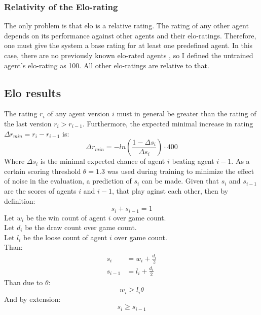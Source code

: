 \documentclass[12pt]{article}
\begin{document}
\subsubsection{Relativity of the Elo-rating}
The only problem is that elo is a relative rating. The rating of any other agent depends on its performance against other agents and their elo-ratings. Therefore, one must give the system a base rating for at least one predefined agent. In this case, there are no previously known elo-rated agents , so I defined the untrained agent's elo-rating as 100. All other elo-ratings are relative to that.

\subsection{Elo results}
The rating \(r_i\) of any agent version \(i\) must in general be greater than the rating of the last version \(r_i > r_{i-1}\). Furthermore, the expected minimal increase in rating \(\Delta r_{min} = r_i - r_{i-1}\) is:
\begin{equation}\label{eq:deltaRCalculation}
\Delta r_{min} = -ln\left(\frac{1- \Delta s_i}{\Delta s_i}\right)\cdot 400
\end{equation}
Where \(\Delta s_i\) is the minimal expected chance of agent \(i\) beating agent \(i-1\).
As a certain scoring threshold \(\theta = 1.3\) was used during training to minimize the effect of noise in the evaluation, a prediction of \(s_i\) can be made. Given that \(s_i\) and \(s_{i-1}\) are the scores of agents \(i\) and \(i-1\), that play aginst each other, then by definition:
\begin{equation}\label{eq:scoreSumm}
s_i + s_{i-1} = 1
\end{equation}
Let \(w_i\) be the win count of agent \(i\) over game count.\\
Let \(d_i\) be the draw count over game count.\\
Let \(l_i\) be the loose count of agent \(i\) over game count.\\
Than:
\begin{align}
s_i &= w_i + \frac{d_i}{2}\\
s_{i-1} &= l_i + \frac{d_i}{2}
\end{align}
Than due to \(\theta\):
\begin{equation}
w_i \geqslant l_i \theta
\end{equation}
And by extension:
\begin{equation}
s_i \geqslant s_{i-1}
\end{equation}
\end{document}

